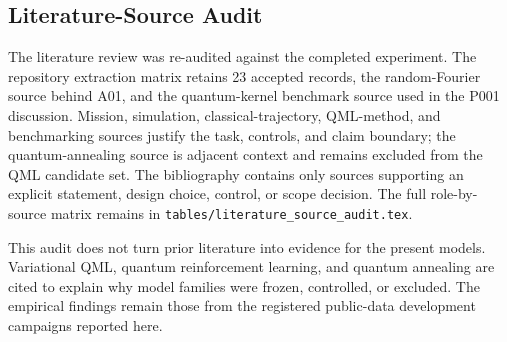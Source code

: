 \subsection*{Literature-Source Audit}

The literature review was re-audited against the completed experiment. The
repository extraction matrix retains 23 accepted records, the random-Fourier
source behind A01, and the quantum-kernel benchmark source used in the P001
discussion. Mission, simulation, classical-trajectory, QML-method, and
benchmarking sources justify the task, controls, and claim boundary; the
quantum-annealing source is adjacent context and remains excluded from the QML
candidate set. The bibliography contains only sources supporting an explicit
statement, design choice, control, or scope decision. The full role-by-source
matrix remains in \texttt{tables/literature\_source\_audit.tex}.

This audit does not turn prior literature into evidence for the present models.
Variational QML, quantum reinforcement learning, and quantum annealing are
cited to explain why model families were frozen, controlled, or excluded. The
empirical findings remain those from the registered public-data development
campaigns reported here.
